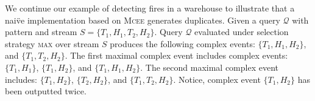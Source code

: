 \begin{example}\label{example:3}
  We continue our example of detecting fires in a warehouse to illustrate that a nai\"ve implementation based on \textsc{Mcee} generates duplicates. Given a query $\mathcal{Q}$ with pattern  and stream $S = \{ T_{1}, H_{1}, T_{2}, H_{2}\}$. Query $\mathcal{Q}$ evaluated under selection strategy \textsc{max} over stream $S$ produces the following complex events: $\{T_{1}, H_{1}, H_{2}\}$, and $\{T_{1}, T_{2}, H_{2}\}$. The first maximal complex event includes complex events: $\{T_{1}, H_{1}\}$, $\{T_{1}, H_{2}\}$, and $\{T_{1}, H_{1}, H_{2}\}$. The second maximal complex event includes: $\{T_{1}, H_{2}\}$, $\{T_{2}, H_{2}\}$, and $\{T_{1}, T_{2}, H_{2}\}$. Notice, complex event $\{T_{1}, H_{2}\}$ has been outputted twice.
\end{example}




